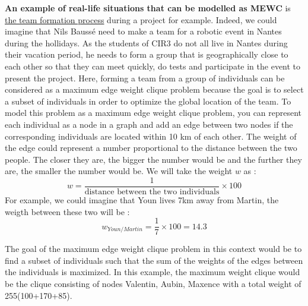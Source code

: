 \documentclass{article}
\begin{document}
\begin{flushleft}

    \textbf{An example of real-life situations that can be modelled as MEWC} is \underline{the team formation process} during a project for example. 
    \newline \newline
    Indeed, we could imagine that Nils Baussé need to make a team for a robotic event in Nantes during the hollidays. As the students of CIR3 do not all live in Nantes during their vacation period, he needs to form a group that is geographically close to each other so that they can meet quickly, do tests and participate in the event to present the project. Here, forming a team from a group of individuals can be considered as a maximum edge weight clique problem because the goal is to select a subset of individuals in order to optimize the global location of the team.
    \newline \newline
    To model this problem as a maximum edge weight clique problem, you can represent each individual as a node in a graph and add an edge between two nodes if the corresponding individuals are located within 10 km of each other. The weight of the edge could represent a number proportional to the distance between the two people. The closer they are, the bigger the number would be and the further they are, the smaller the number would be. We will take the weight $w$ as : $$w = \frac{1}{\text{distance between the two individuals}} \times 100$$
    \newline
    For example, we could imagine that Youn lives 7km away from Martin, the weigth between these two will be : $$w_{Youn/Martin} = \frac{1}{7} \times 100 = 14.3$$
    \newline
    \begin{center}
    \end{center}

    The goal of the maximum edge weight clique problem in this context would be to find a subset of individuals such that the sum of the weights of the edges between the individuals is maximized. In this example, the maximum weight clique would be the clique consisting of nodes Valentin, Aubin, Maxence with a total weight of 255(100+170+85).

\end{flushleft}
\end{document}
